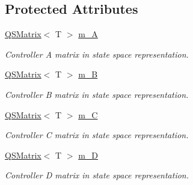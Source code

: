 \subsection*{Protected Attributes}
\begin{DoxyCompactItemize}
\item 
\mbox{\label{classStateSpaceController_ad7269044d376a39889d5f2b0478bd74b}} 
\hyperlink{classQSMatrix}{Q\+S\+Matrix}$<$ T $>$ \hyperlink{classStateSpaceController_ad7269044d376a39889d5f2b0478bd74b}{m\+\_\+A}
\begin{DoxyCompactList}\small\item\em Controller A matrix in state space representation. \end{DoxyCompactList}\item 
\mbox{\label{classStateSpaceController_a3bc4a44bd92c7ffc970a65b90a626e1a}} 
\hyperlink{classQSMatrix}{Q\+S\+Matrix}$<$ T $>$ \hyperlink{classStateSpaceController_a3bc4a44bd92c7ffc970a65b90a626e1a}{m\+\_\+B}
\begin{DoxyCompactList}\small\item\em Controller B matrix in state space representation. \end{DoxyCompactList}\item 
\mbox{\label{classStateSpaceController_a33fd292f395c12a2fca3a6d0f7ef77a0}} 
\hyperlink{classQSMatrix}{Q\+S\+Matrix}$<$ T $>$ \hyperlink{classStateSpaceController_a33fd292f395c12a2fca3a6d0f7ef77a0}{m\+\_\+C}
\begin{DoxyCompactList}\small\item\em Controller C matrix in state space representation. \end{DoxyCompactList}\item 
\mbox{\label{classStateSpaceController_a63bf0b147c6b9eedb0b062dea75b67ac}} 
\hyperlink{classQSMatrix}{Q\+S\+Matrix}$<$ T $>$ \hyperlink{classStateSpaceController_a63bf0b147c6b9eedb0b062dea75b67ac}{m\+\_\+D}
\begin{DoxyCompactList}\small\item\em Controller D matrix in state space representation. \end{DoxyCompactList}\item 
\mbox{\label{classStateSpaceController_a6bac91eca3b49d992f63044e67ba1029}} 

\end{DoxyCompactItemize}
